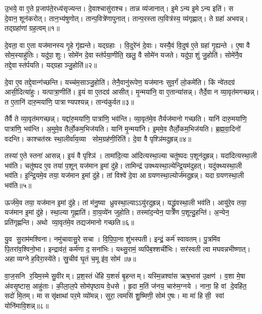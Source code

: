 \clearpage
{}
\setcounter{anuvakam}{0}
उ॒भये॒ वा ए॒ते प्र॒जाप॑ते॒रध्य॑सृज्यन्त। दे॒वाश्चासु॑राश्च। तान्न व्य॑जानात्। इ॒मेऽन्य इ॒मेऽन्य इति॑। स दे॒वान॒शून॑करोत्। तान॒भ्य॑षुणोत्। तान्प॒वित्रे॑णापुनात्। तान्प॒रस्तात्प॒वित्र॑स्य॒ व्य॑गृह्णात्। ते ग्रहा॑ अभवन्न्। तद्ग्रहा॑णां ग्रह॒त्वम्॥१॥

दे॒वता॒ वा ए॒ता यज॑मानस्य गृ॒हे गृ॑ह्यन्ते। यद्ग्रहाः। वि॒दुरे॑नं दे॒वाः। यस्यै॒वं वि॒दुष॑ ए॒ते ग्रहा॑ गृ॒ह्यन्ते। ए॒षा वै सोम॒स्याहु॑तिः। यदु॑पा॒शुः। सोमे॑न दे॒वास्त॑र्पया॒णीति॒ खलु॒ वै सोमे॑न यजते। यदु॑पा॒शुं जु॒होति॑। सोमे॑नै॒व तद्दे॒वास्त॑र्पयति। यद्ग्रहाञ्जु॒होति॑॥२॥

दे॒वा ए॒व तद्दे॒वान्ग॑च्छन्ति। यच्च॑म॒साञ्जु॒होति॑। तेनै॒वानु॑रूपेण॒ यज॑मानः सुव॒र्गं लो॒कमे॑ति। किं न्वे॑तदग्र॑ आसी॒दित्या॑हुः। यत्पात्रा॒णीति॑। इ॒यं वा ए॒तदग्र॑ आसीत्। मृ॒न्मया॑नि॒ वा ए॒तान्या॑सन्न्। तैर्दे॒वा न व्या॒वृत॑मगच्छन्न्। त ए॒तानि॑ दारु॒मया॑णि॒ पात्राण्यपश्यन्न्। तान्य॑कुर्वत॥३॥

तैर्वै ते व्या॒वृत॑मगच्छन्न्। यद्दा॑रु॒मया॑णि॒ पात्रा॑णि॒ भव॑न्ति। व्या॒वृत॑मे॒व तैर्यज॑मानो गच्छति। यानि॑ दारु॒मया॑णि॒ पात्रा॑णि॒ भव॑न्ति। अ॒मुमे॒व तैर्लो॒कम॒भिज॑यति। यानि॑ मृ॒न्मया॑नि। इ॒ममे॒व तैर्लो॒कम॒भिज॑यति। ब्र॒ह्म॒वा॒दिनो॑ वदन्ति। काश्चत॑स्रः स्था॒लीर्वा॑य॒व्या सोम॒ग्रह॑णी॒रिति॑। दे॒वा वै पृश्ञि॑मदुह्रन्न्॥४॥

तस्या॑ ए॒ते स्तना॑ आसन्न्। इ॒यं वै पृश्ञि॑। तामा॑दि॒त्या आ॑दित्यस्था॒ल्या चतु॑ष्पदः प॒शून॑दुह्रन्न्। यदा॑दित्यस्था॒ली भव॑ति। चतु॑ष्पद ए॒व तया॑ प॒शून् यज॑मान इ॒मां दु॑हे। तामिन्द्र॑ उक्थ्यस्था॒ल्येन्द्रि॒यम॑दुहत्। यदु॑क्थ्यस्था॒ली भव॑ति। इ॒न्द्रि॒यमे॒व तया॒ यज॑मान इ॒मां दु॑हे। तां विश्वे॑ दे॒वा आग्रयणस्था॒ल्योर्ज॑मदुह्रन्न्। यदाग्रयणस्था॒ली भव॑ति॥५॥

ऊर्ज॑मे॒व तया॒ यज॑मान इ॒मां दु॑हे। तां म॑नु॒ष्या ध्रुवस्था॒ल्याऽऽयु॑रदुह्रन्न्। यद्ध्रु॑वस्था॒ली भव॑ति। आयु॑रे॒व तया॒ यज॑मान इ॒मां दु॑हे। स्था॒ल्या गृ॒ह्णाति॑। वा॒य॒व्ये॑न जुहोति। तस्मा॑द॒न्येन॒ पात्रे॑ण प॒शून्दु॒हन्ति॑। अ॒न्येन॒ प्रति॑गृह्णन्ति। अथो व्या॒वृत॑मे॒व तद्यज॑मानो गच्छति॥६॥\anuvakamend[ग्र॒ह॒त्वं ग्रहाञ्जु॒होत्य॑कुर्वतादुह्रन्नाग्रयणस्था॒ली भव॑ति॒ नव॑ च]

यु॒व सु॒राम॑मश्विना। नमु॑चावासु॒रे सचा। वि॒पि॒पा॒ना शु॑भस्पती। इन्द्रं॒ कर्म॑ स्वावतम्। पु॒त्रमि॑व पि॒तरा॑व॒श्विनो॒भा। इन्द्राव॑तं॒ कर्म॑णा द॒सना॑भिः। यथ्सु॒रामं॒ व्यपि॑ब॒श्शची॑भिः। सर॑स्वती त्वा मघवन्नभीष्णात्। अहाव्यग्ने ह॒विरा॒स्ये॑ते। स्रु॒चीव॑ घृ॒तं च॒मू इ॑व॒ सोम॑॥७॥

वा॒ज॒सनि र॒यिम॒स्मे सु॒वीरम्। प्र॒श॒स्तं धे॑हि य॒शसं॑ बृ॒हन्तम्। यस्मि॒न्नश्वा॑स ऋष॒भास॑ उ॒क्षण॑। व॒शा मे॒षा अ॑वसृ॒ष्टास॒ आहु॑ताः। की॒ला॒ल॒पे सोम॑पृष्ठाय वे॒धसे। हृ॒दा म॒तिं ज॑नय॒ चारु॑म॒ग्नये। नाना॒ हि वां दे॒वहि॑त॒ सदो॑ मि॒तम्। मा ससृ॑क्षाथां पर॒मे व्यो॑मन्न्। सुरा॒ त्वमसि॑ शु॒ष्मिणी॒ सोम॑ ए॒षः। मा मा॑ हिसी॒ स्वां योनि॑मावि॒शन्न्॥८॥

